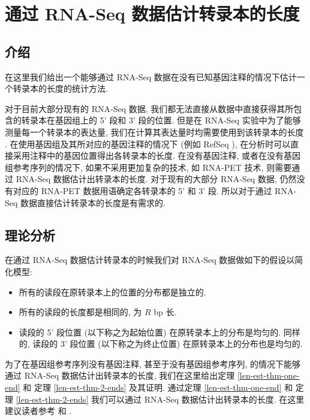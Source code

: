 \chapter{通过 RNA-Seq 数据估计转录本的长度}
\label{chap-lenest}

\section{介绍}
在这里我们给出一个能够通过 RNA-Seq 数据在没有已知基因注释的情况下估计一个转录本的长度的统计方法. 

对于目前大部分现有的 RNA-Seq 数据, 
我们都无法直接从数据中直接获得其所包含的转录本在基因组上的 5' 段和 3' 段的位置. 
但是在 RNA-Seq 实验中为了能够测量每一个转录本的表达量, 
我们在计算其表达量时均需要使用到该转录本的长度 
\cite{mortazavi2008mapping, Jiang15042009, cufflinks.2010}. 
在使用基因组及其所对应的基因注释的情况下 (例如 RefSeq \cite{_refseq}), 
在分析时可以直接采用注释中的基因位置得出各转录本的长度. 
在没有基因注释, 或者在没有基因组参考序列的情况下, 
如果不采用更加复杂的技术, 如 RNA-PET \cite{Fullwood01042009} 技术, 
则需要通过 RNA-Seq 数据估计出转录本的长度. 对于现有的大部分 RNA-Seq 数据, 
仍然没有对应的 RNA-PET 数据用语确定各转录本的 5' 和 3' 段. 
所以对于通过 RNA-Seq 数据直接估计转录本的长度是有需求的. 

\section{理论分析}
在通过 RNA-Seq 数据估计转录本的时候我们对 RNA-Seq 数据做如下的假设以简化模型: 
\begin{itemize}
\item 所有的读段在原转录本上的位置的分布都是独立的. 

\item 所有的读段的长度都是相同的, 为 $R$ bp 长.

\item 读段的 5' 段位置 (以下称之为起始位置) 在原转录本上的分布是均匀的. 
同样的, 读段的 3' 段位置 (以下称之为终止位置) 在原转录本上的分布也是均匀的. 
\end{itemize}

为了在基因组参考序列没有基因注释, 甚至于没有基因组参考序列, 
的情况下能够通过 RNA-Seq 数据估计出转录本的长度, 
我们在这里给出定理 \ref{len-est-thm-one-end} 和 
定理 \ref{len-est-thm-2-ends} 及其证明. 
通过定理 \ref{len-est-thm-one-end} 和 
定理 \ref{len-est-thm-2-ends} 
我们可以通过 RNA-Seq 数据估计出转录本的长度. 
在这里建议读者参考  
和 . 

